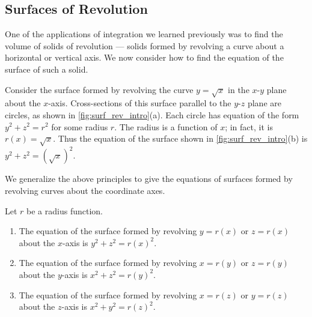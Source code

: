 \subsection{Surfaces of Revolution}

One of the applications of integration we learned previously was to find the volume of solids of revolution --- solids formed by revolving a curve about a horizontal or vertical axis. We now consider how to find the equation of the surface of such a solid.


Consider the surface formed by revolving the curve $y=\sqrt{x}$ in the $x$-$y$ plane about the $x$-axis. Cross-sections of this surface parallel to the $y$-$z$ plane are circles, as shown in \autoref{fig:surf_rev_intro}(a). Each circle has equation of the form $y^2+z^2=r^2$ for some radius $r$. The radius is a function of $x$; in fact, it is $r(x) = \sqrt{x}$. Thus the equation of the surface shown in \autoref{fig:surf_rev_intro}(b) is $y^2+z^2=(\sqrt{x})^2.$

We generalize the above principles to give the equations of surfaces formed by revolving curves about the coordinate axes.

\begin{keyidea}\label{idea:surf_of_revol}
Let $r$ be a radius function. 
\begin{enumerate}
	\item The equation of the surface formed by revolving $y=r(x)$ or $z=r(x)$ about the $x$-axis is $y^2+z^2=r(x)^2$.
	\item The equation of the surface formed by revolving $x=r(y)$ or $z=r(y)$ about the $y$-axis is $x^2+z^2=r(y)^2$.
	\item The equation of the surface formed by revolving $x=r(z)$ or $y=r(z)$ about the $z$-axis is $x^2+y^2=r(z)^2$.
\end{enumerate}
\end{keyidea}

